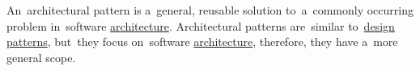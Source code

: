 An~architectural pattern is a~general, reusable solution to~a~commonly occurring problem in~software \hyperref[architecturedesign]{architecture}.  Architectural patterns are~similar to~\hyperref[designpatterns]{design patterns}, but~they focus on~software \hyperref[architecturedesign]{architecture}, therefore, they have a~more general scope.

\label{mvc}